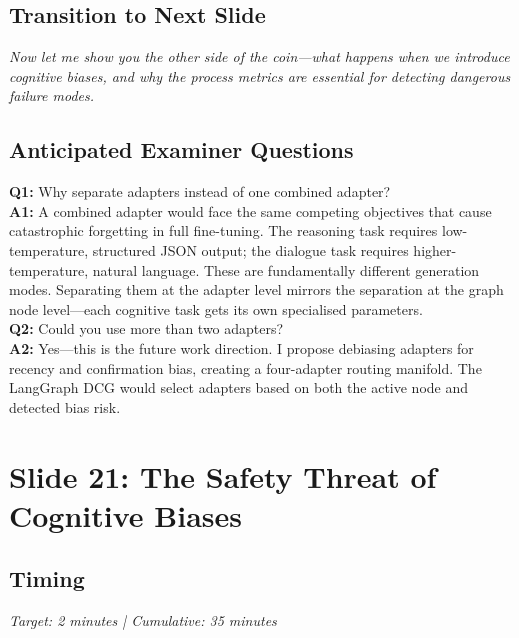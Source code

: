 \documentclass[12pt]{article}
\begin{document}
  \subsection*{Transition to Next Slide}
  {\color{transgreen}
  \textit{Now let me show you the other side of the coin---what happens when we introduce cognitive biases, and why the process metrics are essential for detecting dangerous failure modes.}
  }

  \subsection*{Anticipated Examiner Questions}
  \begin{qabox}
  \textbf{Q1:} Why separate adapters instead of one combined adapter? \\
  \textbf{A1:} A combined adapter would face the same competing objectives that cause catastrophic forgetting in full fine-tuning. The reasoning task requires low-temperature, structured JSON output; the dialogue task requires higher-temperature, natural language. These are fundamentally different generation modes. Separating them at the adapter level mirrors the separation at the graph node level---each cognitive task gets its own specialised parameters. \\[6pt]
  \textbf{Q2:} Could you use more than two adapters? \\
  \textbf{A2:} Yes---this is the future work direction. I propose debiasing adapters for recency and confirmation bias, creating a four-adapter routing manifold. The LangGraph DCG would select adapters based on both the active node and detected bias risk.
  \end{qabox}



  \section{Slide 21: The Safety Threat of Cognitive Biases}

  \subsection*{Timing}
  \textit{Target: 2 minutes | Cumulative: 35 minutes}
\end{document}

